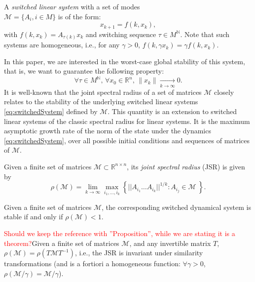A \emph{switched linear system} with a set of modes \\ 
\mbox{$\mathcal{M}= \{A_i, i \in M \}$} is of the form:
\begin{equation}\label{eq:switchedSystem}
x_{k+1} = f(k,x_k),
\end{equation}
with $f(k,x_k) = A_{\tau(k)}x_k$ and switching sequence \mbox{$\tau \in M^{\mathbb{N}}$}. Note that such systems are homogeneous, i.e., for any $\gamma > 0$, $f(k,\gamma x_k) = \gamma f(k,x_k)$.

In this paper, we are interested in the worst-case global stability of this system, that is, we want to guarantee the following property: $$\forall \tau \in M^{\mathbb{N}}, \, \forall x_0 \in \mathbb{R}^n, \, \lVert x_k \rVert \xrightarrow[k \to \infty]{} 0.$$ 
It is well-known that the joint spectral radius of a set of matrices $\mathcal{M}$ closely relates to the stability of the underlying switched linear systems \eqref{eq:switchedSystem} defined by $\mathcal{M}$. This quantity is an extension to switched linear systems of the classic spectral radius for linear systems. It is the maximum asymptotic growth rate of the norm of the state under the dynamics \eqref{eq:switchedSystem}, over all possible initial conditions and sequences of matrices of $\mathcal{M}$.

\begin{defn} 
Given a finite set of matrices \mbox{$\mathcal{M} \subset \mathbb{R}^{n\times n}$}, its \emph{joint spectral radius} (JSR) is given by $$\rho(\mathcal{M}) =\lim_{k \rightarrow \infty} \max_{i_1,\dots, i_k} \left\{ ||A_{i_1} \dots A_{i_k}||^{1/k}: A_{i_j} \in \mathcal{M}\ \right\}. $$
\end{defn}

\begin{property}
Given a finite set of matrices $\mathcal{M}$, the corresponding switched dynamical system is stable if and only if $\rho(\mathcal{M})<1$.
\end{property}

\begin{thm}\label{prop:scaling}
\textcolor{red}{Should we keep the reference with ''Proposition'', while we are stating it is a theorem?}Given a finite set of matrices $\mathcal{M}$, and any invertible matrix $T$, $\rho(\mathcal{M})=\rho(T \mathcal{M} T^{-1})$, i.e., the JSR is invariant under similarity transformations (and is a fortiori a homogeneous function: $\forall  \gamma > 0$, $\rho \left( \mathcal{M}/\gamma \right) = \mathcal{M}/\gamma$).
\end{thm}

